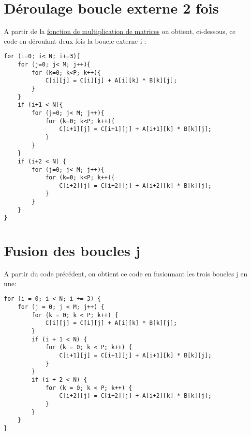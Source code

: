 \documentclass{rapport}
\begin{document}
\section{Déroulage boucle externe 2 fois}

A partir de la \hyperref[algo:algo]{fonction de multiplication de matrices} on obtient, ci-dessous, ce code en déroulant deux fois la boucle externe i : 
\begin{lstlisting}
for (i=0; i< N; i+=3){
    for (j=0; j< M; j++){
        for (k=0; k<P; k++){
            C[i][j] = C[i][j] + A[i][k] * B[k][j];
        }
    }
    if (i+1 < N){
        for (j=0; j< M; j++){
            for (k=0; k<P; k++){
                C[i+1][j] = C[i+1][j] + A[i+1][k] * B[k][j];
            }
        }
    }
    if (i+2 < N) {
        for (j=0; j< M; j++){
            for (k=0; k<P; k++){
                C[i+2][j] = C[i+2][j] + A[i+2][k] * B[k][j];
            }
        }
    }
}
\end{lstlisting}

\section{Fusion des boucles j}
A partir du code précédent, on obtient ce code en fusionnant les trois boucles j en une: 
\begin{lstlisting}
for (i = 0; i < N; i += 3) {
    for (j = 0; j < M; j++) {
        for (k = 0; k < P; k++) {
            C[i][j] = C[i][j] + A[i][k] * B[k][j];
        }
        if (i + 1 < N) {
            for (k = 0; k < P; k++) {
                C[i+1][j] = C[i+1][j] + A[i+1][k] * B[k][j];
            }
        }
        if (i + 2 < N) {
            for (k = 0; k < P; k++) {
                C[i+2][j] = C[i+2][j] + A[i+2][k] * B[k][j];
            }
        }
    }
}
\end{lstlisting}
\end{document}
